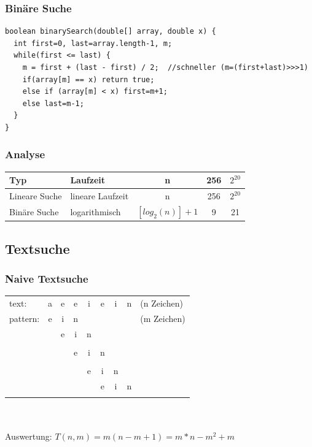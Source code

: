 \documentclass[a4paper,10pt]{article}
\begin{document}
\subsubsection{Bin\"are Suche}
\begin{lstlisting}
boolean binarySearch(double[] array, double x) {
  int first=0, last=array.length-1, m;
  while(first <= last) {
    m = first + (last - first) / 2;  //schneller (m=(first+last)>>>1)
    if(array[m] == x) return true;
    else if (array[m] < x) first=m+1;
    else last=m-1;
  }
}
\end{lstlisting}

\subsubsection{Analyse}
\begin{tabular}{l | l | c | c | c }
	Typ & Laufzeit & n & 256 & $2^{20}$ \\
	\hline
	Lineare Suche & lineare Laufzeit & n & 256 & $2^{20}$ \\
	Bin\"are Suche & logarithmisch & $[log_{2}(n)]+1$ & 9 & 21
\end{tabular}

\subsection{Textsuche}
\subsubsection{Naive Textsuche}
\begin{tabular}{l c c c c c c c l}
	text: & a & e & e & i & e & i & n & (n Zeichen) \\
	pattern: & e & i & n & & & & & (m Zeichen) \\
	& \lightning & e & i & n \\
	& & \checkmark & \lightning \\
	& & & e & i & n \\
	& & & \checkmark & \checkmark & \lightning \\
	& & & & e & i & n \\
	& & & & \lightning & e & i & n \\
	& & & & & \checkmark & \checkmark & \checkmark \\
\end{tabular} \\ \\
Auswertung: $T(n,m) = m(n-m+1)=m*n-m^2+m$
\end{document}
